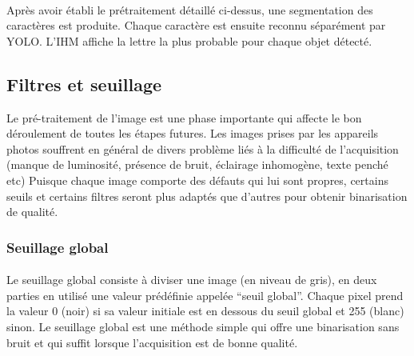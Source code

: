 \documentclass[a4paper]{article}
\begin{document}
			\paragraph{} Après avoir établi le prétraitement détaillé ci-dessus, une segmentation des caractères est produite. Chaque caractère est ensuite reconnu séparément par YOLO. L'IHM affiche la lettre la plus probable pour chaque objet détecté.


			\vspace*{1.5cm}
			\subsection{Filtres et seuillage}
			Le pré-traitement de l'image est une phase importante qui affecte le bon déroulement de toutes les étapes futures. Les images prises par les appareils photos souffrent en général de divers problème liés à la difficulté de l'acquisition (manque de luminosité, présence de bruit, éclairage inhomogène, texte penché etc)
			Puisque chaque image comporte des défauts qui lui sont propres, certains seuils et certains filtres seront plus adaptés que d'autres pour obtenir binarisation de qualité.
			
				\subsubsection{Seuillage global}
				
				\paragraph{} Le seuillage global consiste à diviser une image (en niveau de gris), en deux parties en utilisé une valeur prédéfinie appelée “seuil global”. Chaque pixel prend la valeur 0 (noir) si sa valeur initiale est en dessous du seuil global et 255 (blanc) sinon.
				 \newpage Le seuillage global est une méthode simple qui offre une binarisation sans bruit et qui suffit lorsque l'acquisition est de bonne qualité.\nopagebreak
				
\end{document}

